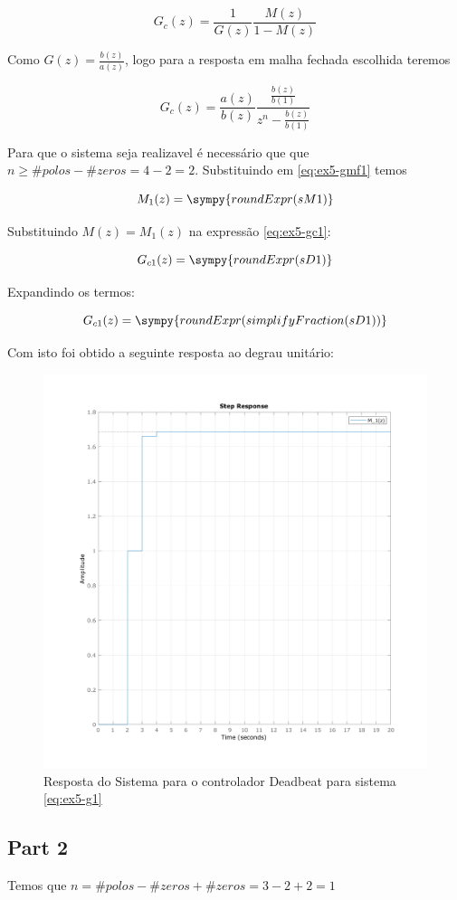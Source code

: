 \documentclass[a4paper,11pt]{article}
\begin{document}
$$
    G_{c}(z) = \frac{1}{G(z)}\frac{M(z)}{1-M(z)}
$$

Como $G(z) = \frac{b(z)}{a(z)}$, logo para a resposta em malha fechada escolhida teremos

\begin{equation}\label{eq:ex5-gc1}
    G_{c}(z) = \frac{a(z)}{b(z)}\frac{\frac{b(z)}{b(1)}}{z^n-\frac{b(z)}{b(1)}}
\end{equation}


Para que o sistema seja realizavel é necessário que que $n \ge \#polos - \#zeros = 4  - 2 = 2$. Substituindo em \ref{eq:ex5-gmf1} temos

$$
M_1(z) = \sympy{roundExpr(sM1)}
$$

Substituindo $M(z) = M_1(z)$ na expressão \ref{eq:ex5-gc1}:

$$G_{c1}(z) = \sympy{roundExpr(sD1)}$$

Expandindo os termos:

$$G_{c1}(z) = \sympy{roundExpr(simplifyFraction(sD1))}$$

Com isto foi obtido a seguinte resposta ao degrau unitário:

\begin{figure}[H]
    \centering
    \includegraphics[width=0.6\linewidth]{img/exsim5-g1-deadbeat-sim.png}
    \caption{Resposta do Sistema para o controlador Deadbeat para sistema \ref{eq:ex5-g1}}
\end{figure}

\subsection{Part 2}

Temos que $n = \#polos - \#zeros + \#zeros = 3  - 2 + 2 = 1$
\end{document}
